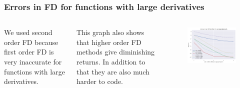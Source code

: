 \documentclass[hyperref={bookmarks=false},aspectratio=169]{beamer}
\begin{document}
\begin{frame}
    \frametitle{Errors in FD for functions with large derivatives}
    \begin{columns}
        We used second order FD because first order FD is very inaccurate for functions with large derivatives.

        This graph also shows that higher order FD methods give diminishing returns. In addition to that they are also much harder to code.
        \begin{figure}[hbt!]
            \centering
            \includegraphics[width=\textwidth]{images/1_x_error_vs_order.png}

        \end{figure}
    \end{columns}

\end{frame}
\end{document}
